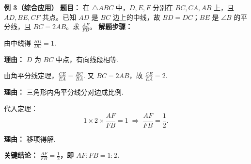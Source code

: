 \begin{examplebox}
	\medskip
	\textbf{\textcolor{CExample}{例 3（综合应用）}}
	\textbf{\textcolor{CExample}{题目：}}
	在 $\triangle ABC$ 中，$D,E,F$ 分别在 $BC,CA,AB$ 上，且 $AD,BE,CF$ 共点。已知 $AD$ 是 $BC$ 边上的中线，故 $BD=DC$；$BE$ 是 $\angle B$ 的平分线，且 $BC=2AB$。求 $\frac{AF}{FB}$。
	\textbf{\textcolor{CExample}{解题步骤：}}
	\begin{description}[style=nextline, leftmargin=2.8em, labelsep=0.5em, itemsep=0.45em]
		\item[\textbf{第一步（中线条件）：}]
			由中线得 $\frac{BD}{DC}=1$.
			\par\textbf{理由：} $D$ 为 $BC$ 中点，有向线段相等.
		\item[\textbf{第二步（角平分线条件）：}]
			由角平分线定理，$\frac{CE}{EA}=\frac{BC}{BA}$. 又 $BC=2AB$，故 $\frac{CE}{EA}=2$.
			\par\textbf{理由：} 三角形内角平分线分对边成比例.
		\item[\textbf{第三步（代入塞瓦）：}]
			代入定理：
			\[
				1\times 2\times\frac{AF}{FB}=1 \;\Longrightarrow\; \frac{AF}{FB}=\frac12.
			\]
			\par\textbf{理由：} 移项得解.
	\end{description}
	\textbf{\textcolor{CExample}{关键结论：}}
	\textbf{$\displaystyle\frac{AF}{FB}=\frac12$，即 $AF:FB=1:2$.}
\end{examplebox}
